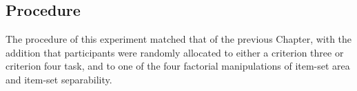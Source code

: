 \subsection{Procedure}
The procedure of this experiment matched that of the previous Chapter, with the addition that participants were randomly allocated to either a criterion three or criterion four task, and to one of the four factorial manipulations of item-set area and item-set separability. 



